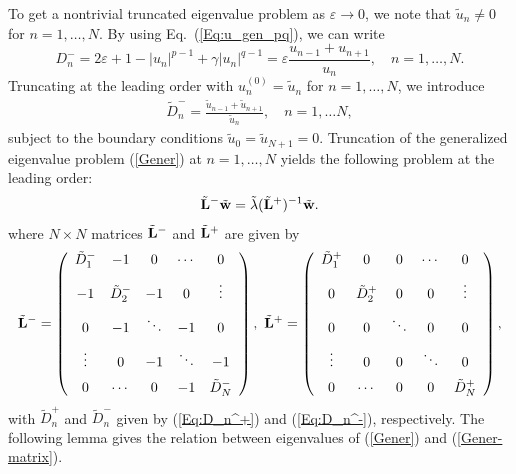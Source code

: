\documentclass[12pt,reqno]{amsart}
\begin{document}
To get a nontrivial truncated eigenvalue problem as $\varepsilon \to 0$, we 
note that $\tilde{u}_n \neq 0$ for $n = 1,\ldots,N$. By using Eq.~(\ref{Eq:u_gen_pq}), we can write 
$$
D_n^- = 2 \varepsilon + 1 - |u_n|^{p-1} + \gamma |u_n|^{q-1} = \varepsilon \frac{u_{n-1} + u_{n+1}}{u_n}, \quad n = 1, \dots, N.
$$
Truncating at the leading order with $u_n^{(0)} = \tilde{u}_n$ for $n = 1,\dots,N$, we introduce 
\begin{gather}
\label{Eq:D_n^-}
\tilde{D}_n^-=\frac{\tilde{u}_{n-1}+\tilde{u}_{n+1}}{\tilde{u}_n}, \quad n=1,\ldots N, 
\end{gather}
subject to the boundary conditions $\tilde{u}_0=\tilde{u}_{N+1}=0$.
Truncation of the generalized eigenvalue problem  (\ref{Gener}) at $n = 1,\ldots,N$  yields the following problem at the leading order:
\begin{gather}
\tilde{\bf L}^-\tilde{\bf w} = \tilde{\lambda}  (\tilde{\bf L}^+)^{-1} \tilde{\bf w}. \label{Gener-matrix}
\end{gather}
where $N\times N$ matrices $\tilde{\bf L}^-$ and $\tilde{\bf L}^+$ are given by 
\begin{gather*}
\tilde{\bf L}^-=\left(
\begin{array}{ccccc}
\tilde{D}_1^-&   -1  &   0   &   \cdots    & 0   \\[2mm]
-1&      \tilde{D}_2^-& -1  &              0  &    \vdots\\[2mm]
0&            -1&     \ddots&         -1&    0\\[2mm]
\vdots&             0&               -1&   \ddots  & -1\\[2mm]
0&   \cdots          &         0&                  -1&     \tilde{D}_N^-
\end{array}
\right),~
\tilde{\bf L}^+=\left(
\begin{array}{ccccc}
\tilde{D}_1^+&   0  &   0   &   \cdots    & 0   \\[2mm]
0&      \tilde{D}_2^+& 0  &              0  &    \vdots\\[2mm]
0&           0&     \ddots&        0&    0\\[2mm]
\vdots&             0&              0&   \ddots  &0\\[2mm]
0&   \cdots          &         0&                0&     \tilde{D}_N^+
\end{array}
\right),
\end{gather*}
with $\tilde{D}_n^+$ and $\tilde{D}_n^-$ given by (\ref{Eq:D_n^+}) and (\ref{Eq:D_n^-}), respectively. The following lemma gives the relation 
between eigenvalues of (\ref{Gener}) and (\ref{Gener-matrix}).
\end{document}
